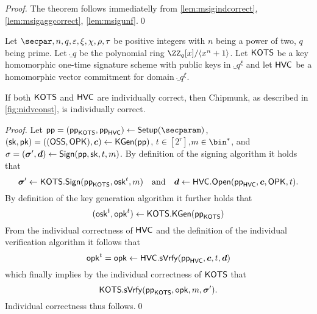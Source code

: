 \begin{proof}
  The theorem follows immediatelly from \autoref{lem:msigindcorrect}, \autoref{lem:msigaggcorrect}, \autoref{lem:msigunf}.\qed
\end{proof}

\begin{lemma}\label{lem:msigindcorrect}
  Let $\secpar,n,q,\varepsilon,\xi,\chi,\rho,\tau$ be positive integers with $n$ being a power of two, $q$ being prime.
Let $\ring_q$ be the polynomial ring $\ZZ_q[x]/\langle x^n+1\rangle$.
Let $\mathsf{KOTS}$ be a key homomorphic one-time signature scheme with public keys in $\ring_q^\xi$ and let $\mathsf{HVC}$ be a homomorphic vector commitment for domain $\ring_q^\xi$.

If both $\mathsf{KOTS}$ and $\mathsf{HVC}$ are individually correct, then Chipmunk, as described in \autoref{fig:nidvconst}, is individually correct.
\end{lemma}
\begin{proof}
  Let $\params=(\hotsparams,\hvcparams)\gets\setup(\secparam)$, $(\mathsf{sk},\mathsf{pk}) = ((\mathsf{OSS},\mathsf{OPK}),\boldsymbol{c})\gets\mathsf{KGen}(\mathsf{pp})$, $t\in[2^\tau]$,$m\in\bin^*$, and $\sigma = (\boldsymbol{\sigma}',\boldsymbol{d}) \gets \mathsf{Sign}(\mathsf{pp},\mathsf{sk},t,m)$.
  By definition of the signing algorithm it holds that
  \[
    \boldsymbol{\sigma}' \gets \mathsf{KOTS}.\mathsf{Sign}(\mathsf{pp}_{\mathsf{KOTS}},\mathsf{osk}^t,m) \quad \text{and} \quad \boldsymbol{d} \gets \mathsf{HVC}.\mathsf{Open}(\mathsf{pp}_{\mathsf{HVC}},\boldsymbol{c},\mathsf{OPK},t).
  \]
  By definition of the key generation algorithm it further holds that
  \[
    (\mathsf{osk}^t,\mathsf{opk}^t) \gets \mathsf{KOTS}.\mathsf{KGen}(\mathsf{pp}_{\mathsf{KOTS}})
  \]
  From the individual correctness of $\mathsf{HVC}$ and the definition of the individual verification algorithm it follows that
  \[
    \mathsf{opk}^t = \mathsf{opk} \gets \mathsf{HVC}.\mathsf{sVrfy}(\mathsf{pp}_{\mathsf{HVC}},\boldsymbol{c},t,\boldsymbol{d})
  \]
  which finally implies by the individual correctness of $\mathsf{KOTS}$ that
  \[
    \mathsf{KOTS}.\mathsf{sVrfy}(\mathsf{pp}_{\mathsf{KOTS}},\mathsf{opk},m,\boldsymbol{\sigma}').
  \]
  Individual correctness thus follows.\qed
\end{proof}

